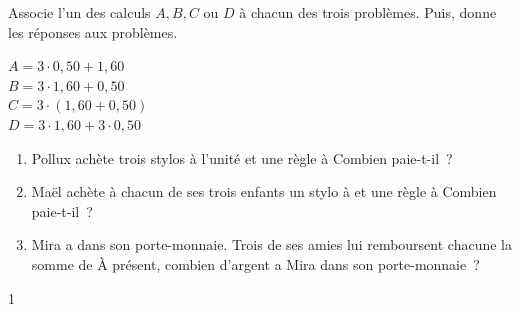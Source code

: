 \documentclass[a4paper,11pt]{report}
\begin{document}
\begin{exo}{
    Associe l'un des calculs $A, B, C$ ou $D$ à chacun des trois problèmes. Puis, donne les réponses aux problèmes.
    \vspace{-0.5cm}
    \begin{center}
    \begin{multicols}{2}
    $A=3\cdot0,50+1,60$ \\
    $B=3\cdot1,60+0,50$ \\
    $C=3\cdot(1,60+0,50)$ \\
    $D=3\cdot1,60+3\cdot0,50$    
    \end{multicols}
    \end{center}
    
    \begin{enumerate}
	    \item[\ligne{2}] Pollux achète trois stylos à  l'unité et une règle à  Combien paie-t-il~?
	    \item[\ligne{2}] Maël achète à chacun de ses trois enfants un stylo à  et une règle à  Combien paie-t-il~? 
	    \item[\ligne{2}] Mira a  dans son porte-monnaie. Trois de ses amies lui remboursent chacune la somme de  À présent, combien d'argent a Mira dans son porte-monnaie~?
    \end{enumerate}
    
}{1}\end{exo}





\end{document}
